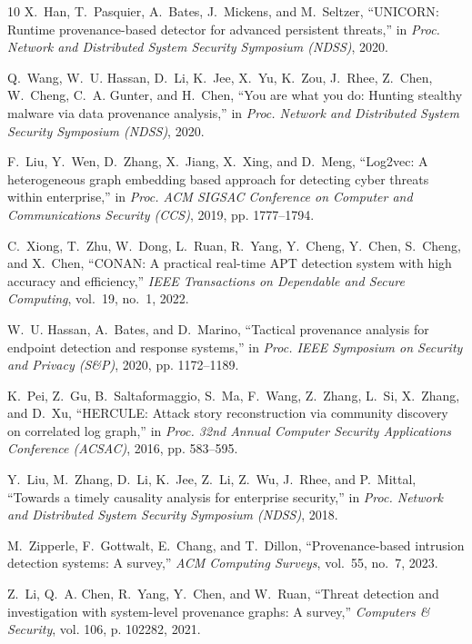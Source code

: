 \documentclass[conference]{IEEEtran}
\begin{document}
\begin{thebibliography}{10}
X.~Han, T.~Pasquier, A.~Bates, J.~Mickens, and M.~Seltzer, ``{UNICORN}: Runtime
  provenance-based detector for advanced persistent threats,'' in \emph{Proc.
  Network and Distributed System Security Symposium (NDSS)}, 2020.

Q.~Wang, W.~U. Hassan, D.~Li, K.~Jee, X.~Yu, K.~Zou, J.~Rhee, Z.~Chen,
  W.~Cheng, C.~A. Gunter, and H.~Chen, ``You are what you do: Hunting stealthy
  malware via data provenance analysis,'' in \emph{Proc. Network and
  Distributed System Security Symposium (NDSS)}, 2020.

F.~Liu, Y.~Wen, D.~Zhang, X.~Jiang, X.~Xing, and D.~Meng, ``{Log2vec}: A
  heterogeneous graph embedding based approach for detecting cyber threats
  within enterprise,'' in \emph{Proc. ACM SIGSAC Conference on Computer and
  Communications Security (CCS)}, 2019, pp. 1777--1794.

C.~Xiong, T.~Zhu, W.~Dong, L.~Ruan, R.~Yang, Y.~Cheng, Y.~Chen, S.~Cheng, and
  X.~Chen, ``{CONAN}: A practical real-time {APT} detection system with high
  accuracy and efficiency,'' \emph{IEEE Transactions on Dependable and Secure
  Computing}, vol.~19, no.~1, 2022.

W.~U. Hassan, A.~Bates, and D.~Marino, ``Tactical provenance analysis for
  endpoint detection and response systems,'' in \emph{Proc. IEEE Symposium on
  Security and Privacy (S\&P)}, 2020, pp. 1172--1189.

K.~Pei, Z.~Gu, B.~Saltaformaggio, S.~Ma, F.~Wang, Z.~Zhang, L.~Si, X.~Zhang,
  and D.~Xu, ``{HERCULE}: Attack story reconstruction via community discovery
  on correlated log graph,'' in \emph{Proc. 32nd Annual Computer Security
  Applications Conference (ACSAC)}, 2016, pp. 583--595.

Y.~Liu, M.~Zhang, D.~Li, K.~Jee, Z.~Li, Z.~Wu, J.~Rhee, and P.~Mittal,
  ``Towards a timely causality analysis for enterprise security,'' in
  \emph{Proc. Network and Distributed System Security Symposium (NDSS)}, 2018.

M.~Zipperle, F.~Gottwalt, E.~Chang, and T.~Dillon, ``Provenance-based intrusion
  detection systems: A survey,'' \emph{ACM Computing Surveys}, vol.~55, no.~7,
  2023.

Z.~Li, Q.~A. Chen, R.~Yang, Y.~Chen, and W.~Ruan, ``Threat detection and
  investigation with system-level provenance graphs: A survey,''
  \emph{Computers \& Security}, vol. 106, p. 102282, 2021.


\end{thebibliography}
\end{document}
